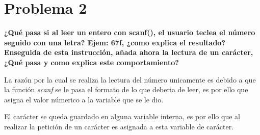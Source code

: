 \section*{Problema 2}
\textbf{¿Qué pasa si al leer un entero con scanf(), el usuario teclea el número seguido con una letra? Ejem: 67f, ¿como explica el resultado? Enseguida de esta instrucción, añada ahora la lectura de un carácter, ¿Qué pasa y como explica este comportamiento?}

La razón por la cual se realiza la lectura del número unicamente es debido a que la función \textit{scanf} se le pasa el formato de lo que deberia de leer, es por ello que asigna el valor númerico a la variable que se le dio.

El carácter se queda guardado en alguna variable interna, es por ello que al realizar la petición de un carácter es asignada a esta variable de carácter.